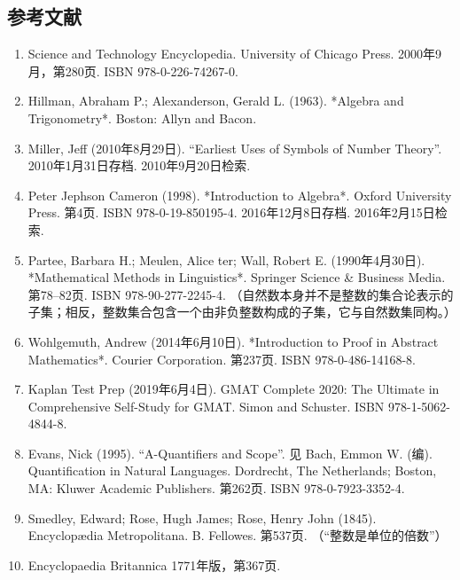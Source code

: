 \subsection{参考文献}
\begin{enumerate}
\item Science and Technology Encyclopedia. University of Chicago Press. 2000年9月，第280页. ISBN 978-0-226-74267-0.
\item Hillman, Abraham P.; Alexanderson, Gerald L. (1963). *Algebra and Trigonometry*. Boston: Allyn and Bacon.
\item Miller, Jeff (2010年8月29日). “Earliest Uses of Symbols of Number Theory”. 2010年1月31日存档. 2010年9月20日检索.
\item Peter Jephson Cameron (1998). *Introduction to Algebra*. Oxford University Press. 第4页. ISBN 978-0-19-850195-4. 2016年12月8日存档. 2016年2月15日检索.
\item Partee, Barbara H.; Meulen, Alice ter; Wall, Robert E. (1990年4月30日). *Mathematical Methods in Linguistics*. Springer Science & Business Media. 第78–82页. ISBN 978-90-277-2245-4. （自然数本身并不是整数的集合论表示的子集；相反，整数集合包含一个由非负整数构成的子集，它与自然数集同构。）
\item Wohlgemuth, Andrew (2014年6月10日). *Introduction to Proof in Abstract Mathematics*. Courier Corporation. 第237页. ISBN 978-0-486-14168-8.
\item Kaplan Test Prep (2019年6月4日). GMAT Complete 2020: The Ultimate in Comprehensive Self-Study for GMAT. Simon and Schuster. ISBN 978-1-5062-4844-8.
\item Evans, Nick (1995). “A-Quantifiers and Scope”. 见 Bach, Emmon W. (编). Quantification in Natural Languages. Dordrecht, The Netherlands; Boston, MA: Kluwer Academic Publishers. 第262页. ISBN 978-0-7923-3352-4.
\item Smedley, Edward; Rose, Hugh James; Rose, Henry John (1845). Encyclopædia Metropolitana. B. Fellowes. 第537页. （“整数是单位的倍数”）
\item Encyclopaedia Britannica 1771年版，第367页.

\end{enumerate}
